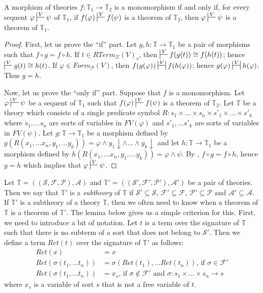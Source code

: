 \documentclass[reqno]{amsart}
\theoremstyle{definition}
\theoremstyle{remark}
\numberwithin{figure}{section}
\begin{document}
\begin{prop}[mono]
A morphism of theories $f : \mathbb{T}_1 \to \mathbb{T}_2$ is a monomorphism if and only if, for every sequent $\varphi \sststile{}{V} \psi$ of $\mathbb{T}_1$,
if $f(\varphi) \sststile{}{V} f(\psi)$ is a theorem of $\mathbb{T}_2$, then $\varphi \sststile{}{V} \psi$ is a theorem of $\mathbb{T}_1$.
\end{prop}
\begin{proof}
First, let us prove the ``if'' part.
Let $g,h : \mathbb{T} \to \mathbb{T}_1$ be a pair of morphisms such that $f \circ g = f \circ h$.
If $t \in RTerm_\Sigma(V)_s$, then $\sststile{}{V} f(g(t)) \cong f(h(t))$; hence $\sststile{}{V} g(t) \cong h(t)$.
If $\varphi \in Form_\mathcal{P}(V)$, then $f(g(\varphi)) \ssststile{}{V} f(h(\varphi))$; hence $g(\varphi) \ssststile{}{V} h(\varphi)$.
Thus $g = h$.

Now, let us prove the ``only if'' part.
Suppose that $f$ is a monomorphism.
Let $\varphi \sststile{}{V} \psi$ be a sequent of $\mathbb{T}_1$ such that $f(\varphi) \sststile{}{V} f(\psi)$ is a theorem of $\mathbb{T}_2$.
Let $\mathbb{T}$ be a theory which consists of a single predicate symbol $R : s_1 \times \ldots \times s_n \times s'_1 \times \ldots \times s'_k$
where $s_1, \ldots s_n$ are sorts of variables in $FV(\varphi)$ and $s'_1, \ldots s'_k$ are sorts of variables in $FV(\psi)$.
Let $g : \mathbb{T} \to \mathbb{T}_1$ be a morphism defined by $g(R(x_1, \ldots x_n, y_1, \ldots y_k)) = \varphi \land y_1\!\downarrow \land \ldots \land y_k\!\downarrow$ and
let $h : \mathbb{T} \to \mathbb{T}_1$ be a morphism defined by $h(R(x_1, \ldots x_n, y_1, \ldots y_k)) = \varphi \land \psi$.
By , $f \circ g = f \circ h$, hence $g = h$ which implies that $\varphi \sststile{}{V} \psi$.
\end{proof}

Let $\mathbb{T} = ((\mathcal{S},\mathcal{F},\mathcal{P}),\mathcal{A})$ and $\mathbb{T}' = ((\mathcal{S}',\mathcal{F}',\mathcal{P}'),\mathcal{A}')$ be a pair of theories.
Then we say that $\mathbb{T}'$ is a \emph{subtheory} of $\mathbb{T}$ if $\mathcal{S}' \subseteq \mathcal{S}$, $\mathcal{F}' \subseteq \mathcal{F}$, $\mathcal{P}' \subseteq \mathcal{P}$ and $\mathcal{A}' \subseteq \mathcal{A}$.
If $\mathbb{T}'$ is a subtheory of a theory $\mathbb{T}$, then we often need to know when a theorem of $\mathbb{T}$ is a theorem of $\mathbb{T}'$.
The lemma below gives us a simple criterion for this.
First, we need to introduce a bit of notation.
Let $t$ is a term over the signature of $\mathbb{T}$ such that there is no subterm of a sort that does not belong to $\mathcal{S}'$.
Then we define a term $Ret(t)$ over the signature of $\mathbb{T}'$ as follows:
\begin{align*}
Ret(x) & = x \\
Ret(\sigma(t_1, \ldots t_n)) & = \sigma(Ret(t_1), \ldots Ret(t_n)) \text{, if $\sigma \in \mathcal{F}'$} \\
Ret(\sigma(t_1, \ldots t_n)) & = x_s \text{, if $\sigma \notin \mathcal{F}'$ and $\sigma : s_1 \times \ldots \times s_n \to s$}
\end{align*}
where $x_s$ is a variable of sort $s$ that is not a free variable of $t$.
\end{document}
